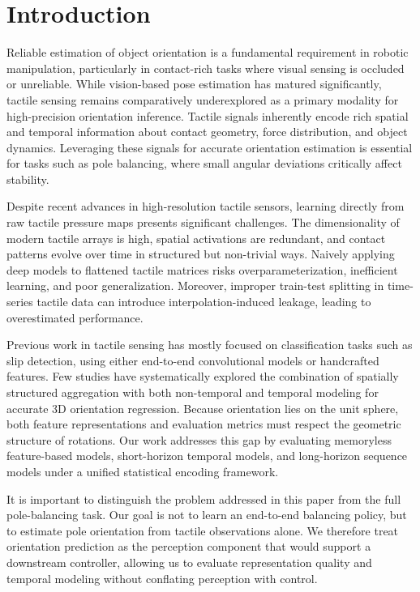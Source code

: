 \documentclass{article}
\begin{document}
    \section{Introduction}
    \label{intro}
    
    Reliable estimation of object orientation is a fundamental requirement in robotic manipulation, particularly in contact-rich tasks where visual sensing is occluded or unreliable. While vision-based pose estimation has matured significantly, tactile sensing remains comparatively underexplored as a primary modality for high-precision orientation inference. Tactile signals inherently encode rich spatial and temporal information about contact geometry, force distribution, and object dynamics. Leveraging these signals for accurate orientation estimation is essential for tasks such as pole balancing, where small angular deviations critically affect stability.
    
    Despite recent advances in high-resolution tactile sensors, learning directly from raw tactile pressure maps presents significant challenges. The dimensionality of modern tactile arrays is high, spatial activations are redundant, and contact patterns evolve over time in structured but non-trivial ways. Naively applying deep models to flattened tactile matrices risks overparameterization, inefficient learning, and poor generalization. Moreover, improper train-test splitting in time-series tactile data can introduce interpolation-induced leakage, leading to overestimated performance.
    
    Previous work in tactile sensing has mostly focused on classification tasks such as slip detection, using either end-to-end convolutional models or handcrafted features. Few studies have systematically explored the combination of spatially structured aggregation with both non-temporal and temporal modeling for accurate 3D orientation regression. Because orientation lies on the unit sphere, both feature representations and evaluation metrics must respect the geometric structure of rotations. Our work addresses this gap by evaluating memoryless feature-based models, short-horizon temporal models, and long-horizon sequence models under a unified statistical encoding framework.

    It is important to distinguish the problem addressed in this paper from the full pole-balancing task. Our goal is not to learn an end-to-end balancing policy, but to estimate pole orientation from tactile observations alone. We therefore treat orientation prediction as the perception component that would support a downstream controller, allowing us to evaluate representation quality and temporal modeling without conflating perception with control.
    
\end{document}
